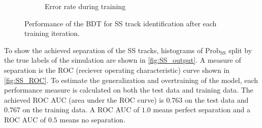 \begin{figure}
\begin{subfigure}{0.5\textwidth}
        \caption{Error rate during training}
    \end{subfigure}%
    \caption{Performance of the BDT for SS track identification after each training iteration.}
    \label{fig:SS_history}
\end{figure}

To show the achieved separation of the SS tracks, histograms of $\text{Prob}_\text{SS}$ split by the true labels of the simulation are shown in \cref{fig:SS_output}.
A measure of separation is the ROC (reciever operating characteristic) curve shown in \cref{fig:SS_ROC}.
To estimate the generalization and overtraining of the model, each performance measure is calculated on both the test data and training data.
The achieved ROC AUC (area under the ROC curve) is $0.763$ on the test data and $0.767$ on the training data.
A ROC AUC of $1.0$ means perfect separation and a ROC AUC of $0.5$ means no separation.

